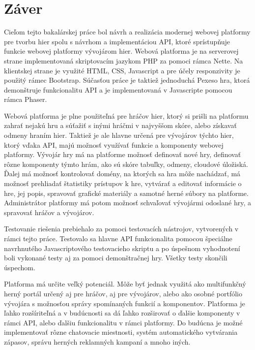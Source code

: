 \chapter{Záver}
\label{chap:zaver}
Cieľom tejto bakalárskej práce bol návrh a realizácia modernej webovej platformy pre tvorbu hier spolu s návrhom a implementáciou API, ktoré sprístupňuje funkcie webovej platformy vývojárom hier. Webová platforma je na serverovej strane implementovaná skriptovacím jazykom PHP za pomoci rámca Nette. Na klientskej strane je využité HTML, CSS, Javascript a pre účely responzivity je použitý rámec Bootstrap. Súčasťou práce je taktiež jednoduchá Pexeso hra, ktorá demonštruje funkcionalitu API a je implementovaná v Javascripte pomocou rámca Phaser. 

Webová platforma je plne použiteľná pre hráčov hier, ktorý si prišli na platformu zahrať nejakú hru a súťažiť s inými hráčmi v najvyššom skóre, alebo získavať odmeny hraním hier. Taktiež je ale hlavne určená pre vývojárov týchto hier, ktorý vďaka API, majú možnosť využívať funkcie a komponenty webovej platformy. Vývojár hry má na platforme možnosť definovať nové hry, definovať rôzne komponenty týmto hrám, ako sú skóre tabuľky, odmeny, cloudové úložiská. Ďalej má možnosť kontrolovať domény, na ktorých sa hra môže nachádzať, má možnosť prehliadať štatistiky prístupov k hre, vytvárať a editovať informácie o hre, jej popis, spravovať grafické materiály a samotné herné súbory na platforme.  Administrátor platformy má potom možnosť schvaľovať vývojármi odoslané hry, a spravovať hráčov a vývojárov. 

Testovanie riešenia prebiehalo za pomoci testovacích nástrojov, vytvorených v rámci tejto práce. Testovalo sa hlavne API funkcionalita pomocou špeciálne navrhnutého Javascriptového testovacieho skriptu a po úspešnom vyhodnotení boli vykonané testy aj za pomoci demonštračnej hry. Všetky testy skončili úspechom.  

Platforma má určite veľký potenciál. Môže byť jednak využitá ako multifunkčný herný portál určený aj pre hráčov, aj pre vývojárov, alebo ako osobné portfólio vývojára s možnosťou správy spomínaných funkcií a komponentov. Platforma je ľahko rozšíriteľná a v budúcnosti sa dá ľahko rozširovať o ďalšie komponenty v rámci API, alebo ďalšiu funkcionalitu v rámci platformy. Do budúcna je možné implementovať rôzne chatovacie miestnosti, systém automatického vytvárania zápasov, správu herných reklamných kampaní a mnoho iných. 















